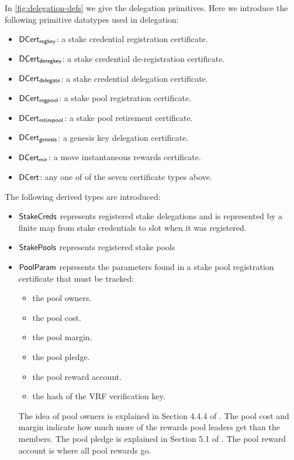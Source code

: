 In \cref{fig:delegation-defs} we give the delegation primitives.
Here we introduce the following primitive datatypes used in delegation:

\begin{itemize}
\item $\mathsf{DCert_{regkey}}$: a stake credential registration certificate.
\item $\mathsf{DCert_{deregkey}}$: a stake credential de-registration certificate.
\item $\mathsf{DCert_{delegate}}$: a stake credential delegation certificate.
\item $\mathsf{DCert_{regpool}}$: a stake pool registration certificate.
\item $\mathsf{DCert_{retirepool}}$: a stake pool retirement certificate.
\item $\mathsf{DCert_{genesis}}$: a genesis key delegation certificate.
\item $\mathsf{DCert_{mir}}$: a move instantaneous rewards certificate.
\item $\mathsf{DCert}$: any one of of the seven certificate types above.
\end{itemize}
The following derived types are introduced:
\begin{itemize}
\item $\mathsf{StakeCreds}$ represents registered stake delegations and is
  represented by a finite map from stake credentials to slot when it was
  registered.
\item$\mathsf{StakePools}$ represents registered stake pools
\item $\mathsf{PoolParam}$ represents the parameters found in a stake pool registration certificate
  that must be tracked:
  \begin{itemize}
    \item the pool owners.
    \item the pool cost.
    \item the pool margin.
    \item the pool pledge.
    \item the pool reward account.
    \item the hash of the VRF verification key.
  \end{itemize}
  The idea of pool owners is explained in Section 4.4.4 of \cite{delegation_design}.
  The pool cost and margin indicate how much more of the rewards pool leaders
  get than the members.
  The pool pledge is explained in Section 5.1 of \cite{delegation_design}.
  The pool reward account is where all pool rewards go.
\end{itemize}

